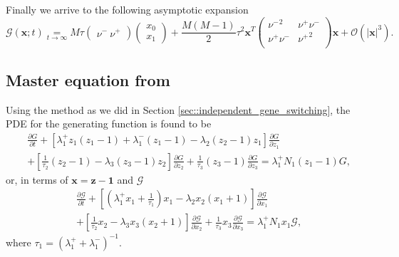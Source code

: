 \documentclass[a4paper, 11pt]{article}
\newcommand\underl[2]{\mathrel{\mathop{#2}\limits_{#1}}}
\begin{document}
Finally we arrive to the following asymptotic expansion 
\begin{equation*}
  \mathcal G(\mathbf x; t) \underl{t\to\infty}{=}M\tau
  \begin{pmatrix}
    \nu^-\ 
    \nu^+
  \end{pmatrix}
  \begin{pmatrix}
  x_0\\
  x_1
  \end{pmatrix}
  + \frac{M(M-1)}{2}\tau^2\mathbf x^T
  \left( \begin{array}{cc}
    {\nu^-}^2 & \nu^+\nu^-\\
    \nu^+\nu^- & {\nu^+}^2 \\
  \end{array} \right)\mathbf x
  + \mathcal O(|\mathbf x|^3).
\end{equation*}

\subsection{Master equation from \cite{PAULSSON2005157}}
Using the method as we did in Section \ref{sec::independent_gene_switching}, the PDE for the generating function is found to be
\begin{equation*}
  \begin{split}
    &\frac{\partial G}{\partial t} + \left[\lambda_1^+z_1(z_1-1) + \lambda_1^-(z_1-1) - \lambda_2(z_2-1)z_1\right]\frac{\partial G}{\partial z_1}\\ &+ \left[\frac{1}{\tau_2}(z_2-1) - \lambda_3(z_3-1)z_2\right]\frac{\partial G}{\partial z_2} + \frac{1}{\tau_3}(z_3-1)\frac{\partial G}{\partial z_3} = \lambda_1^+N_1(z_1-1)G,
  \end{split}
\end{equation*}
or, in terms of $\mathbf x = \mathbf z - \mathbf 1$ and $\mathcal G$
\begin{equation} \label{full_Paulsson_PDE_x}
  \begin{split}
    & \frac{\partial \mathcal G}{\partial t} + \left[(\lambda_1^+x_1+\frac{1}{\tau_1})x_1  - \lambda_2x_2(x_1+1)\right]\frac{\partial \mathcal G}{\partial x_1}\\ &+ \left[\frac{1}{\tau_2}x_2 - \lambda_3x_3(x_2+1)\right]\frac{\partial \mathcal G}{\partial x_2} + \frac{1}{\tau_3}x_3\frac{\partial \mathcal G}{\partial x_3} = \lambda_1^+N_1x_1\mathcal G,
  \end{split}
\end{equation}
where $\tau_1 = (\lambda_1^+ + \lambda_1^-)^{-1}$.
\end{document}
